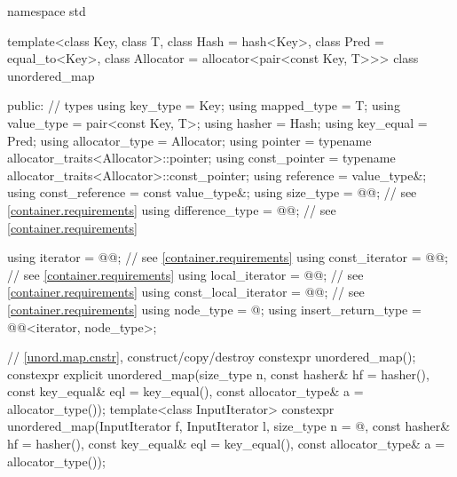 %
\begin{codeblock}
namespace std {
  template<class Key,
           class T,
           class Hash = hash<Key>,
           class Pred = equal_to<Key>,
           class Allocator = allocator<pair<const Key, T>>>
  class unordered_map {
  public:
    // types
    using key_type             = Key;
    using mapped_type          = T;
    using value_type           = pair<const Key, T>;
    using hasher               = Hash;
    using key_equal            = Pred;
    using allocator_type       = Allocator;
    using pointer              = typename allocator_traits<Allocator>::pointer;
    using const_pointer        = typename allocator_traits<Allocator>::const_pointer;
    using reference            = value_type&;
    using const_reference      = const value_type&;
    using size_type            = @@; // see \ref{container.requirements}
    using difference_type      = @@; // see \ref{container.requirements}

    using iterator             = @@; // see \ref{container.requirements}
    using const_iterator       = @@; // see \ref{container.requirements}
    using local_iterator       = @@; // see \ref{container.requirements}
    using const_local_iterator = @@; // see \ref{container.requirements}
    using node_type            = @\unspec@;
    using insert_return_type   = @@<iterator, node_type>;

    // \ref{unord.map.cnstr}, construct/copy/destroy
    constexpr unordered_map();
    constexpr explicit unordered_map(size_type n, const hasher& hf = hasher(),
                                     const key_equal& eql = key_equal(),
                                     const allocator_type& a = allocator_type());
    template<class InputIterator>
      constexpr unordered_map(InputIterator f, InputIterator l,
                              size_type n = @\seebelow@, const hasher& hf = hasher(),
                              const key_equal& eql = key_equal(),
                              const allocator_type& a = allocator_type());

}}
\end{codeblock}
